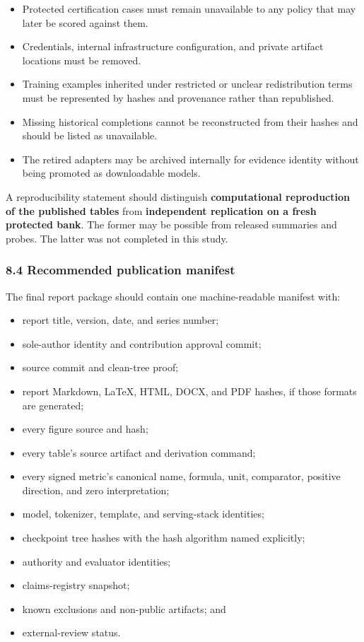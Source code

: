 \documentclass[
  9pt,
  letterpaper,
]{article}
\providecommand{\tightlist}{%
  \setlength{\itemsep}{0pt}\setlength{\parskip}{0pt}}
\begin{document}
\begin{itemize}
\tightlist
\item
  Protected certification cases must remain unavailable to any policy
  that may later be scored against them.
\item
  Credentials, internal infrastructure configuration, and private
  artifact locations must be removed.
\item
  Training examples inherited under restricted or unclear redistribution
  terms must be represented by hashes and provenance rather than
  republished.
\item
  Missing historical completions cannot be reconstructed from their
  hashes and should be listed as unavailable.
\item
  The retired adapters may be archived internally for evidence identity
  without being promoted as downloadable models.
\end{itemize}

A reproducibility statement should distinguish \textbf{computational
reproduction of the published tables} from \textbf{independent
replication on a fresh protected bank}. The former may be possible from
released summaries and probes. The latter was not completed in this
study.

\hypertarget{84-recommended-publication-manifest}{%
\subsubsection{8.4 Recommended publication
manifest}\label{84-recommended-publication-manifest}}

The final report package should contain one machine-readable manifest
with:

\begin{itemize}
\tightlist
\item
  report title, version, date, and series number;
\item
  sole-author identity and contribution approval commit;
\item
  source commit and clean-tree proof;
\item
  report Markdown, LaTeX, HTML, DOCX, and PDF hashes, if those formats
  are generated;
\item
  every figure source and hash;
\item
  every table's source artifact and derivation command;
\item
  every signed metric's canonical name, formula, unit, comparator,
  positive direction, and zero interpretation;
\item
  model, tokenizer, template, and serving-stack identities;
\item
  checkpoint tree hashes with the hash algorithm named explicitly;
\item
  authority and evaluator identities;
\item
  claims-registry snapshot;
\item
  known exclusions and non-public artifacts; and
\item
  external-review status.
\end{itemize}
\end{document}
